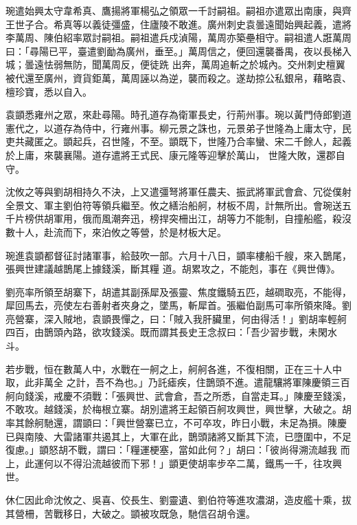 \begin{pinyinscope}
 琬遣始興太守韋希真、鷹揚將軍楊弘之領眾一千討嗣祖。嗣祖亦遣眾出南康，與齊王世子合。希真等以義徒彊盛，住廬陵不敢進。廣州刺史袁曇遠聞始興起義，遣將李萬周、陳伯紹率眾討嗣祖。嗣祖遣兵戍湞陽，萬周亦築壘相守。嗣祖遣人誑萬周曰：「尋陽已平，臺遣劉勔為廣州，垂至。」萬周信之，便回還襲番禺，夜以長梯入城；曇遠怯弱無防，聞萬周反，便徒跣
 出奔，萬周追斬之於城內。交州刺史檀翼被代還至廣州，資貨鉅萬，萬周誣以為逆，襲而殺之。遂劫掠公私銀帛，藉略袁、檀珍寶，悉以自入。



 袁顗悉雍州之眾，來赴尋陽。時孔道存為衛軍長史，行荊州事。琬以黃門侍郎劉道憲代之，以道存為侍中，行雍州事。柳元景之誅也，元景弟子世隆為上庸太守，民吏共藏匿之。顗起兵，召世隆，不至。顗既下，世隆乃合率蠻、宋二千餘人，起義於上庸，來襲襄陽。道存遣將王式民、康元隆等迎擊於萬山，
 世隆大敗，還郡自守。



 沈攸之等與劉胡相持久不決，上又遣彊弩將軍任農夫、振武將軍武會倉、冗從僕射全景文、軍主劉伯符等領兵繼至。攸之繕治船舸，材板不周，計無所出。會琬送五千片榜供胡軍用，俄而風潮奔迅，榜捍突柵出江，胡等力不能制，自撞船艦，殺沒數十人，赴流而下，來泊攸之等營，於是材板大足。



 琬進袁顗都督征討諸軍事，給鼓吹一部。六月十八日，顗率樓船千艘，來入鵲尾，張興世建議越鵲尾上據錢溪，斷其糧
 道。胡累攻之，不能剋，事在《興世傳》。



 劉亮率所領至胡寨下，胡遣其副孫犀及張靈、焦度鐵騎五匹，越磵取亮，不能得，犀回馬去，亮使左右善射者夾身之，墜馬，斬犀首。張繼伯副馬可率所領來降。劉亮營寨，深入賊地，袁顗畏憚之，曰：「賊入我肝臟里，何由得活！」劉胡率輕舸四百，由鵲頭內路，欲攻錢溪。既而謂其長史王念叔曰：「吾少習步戰，未閑水斗。



 若步戰，恒在數萬人中，水戰在一舸之上，舸舸各進，不復相關，正在三十人中取，此非萬全
 之計，吾不為也。」乃託瘧疾，住鵲頭不進。遣龍驤將軍陳慶領三百舸向錢溪，戒慶不須戰：「張興世、武會倉，吾之所悉，自當走耳。」陳慶至錢溪，不敢攻。越錢溪，於梅根立寨。胡別遣將王起領百舸攻興世，興世擊，大破之。胡率其餘舸馳還，謂顗曰：「興世營寨已立，不可卒攻，昨日小戰，未足為損。陳慶已與南陵、大雷諸軍共遏其上，大軍在此，鵲頭諸將又斷其下流，已墮圍中，不足復慮。」顗怒胡不戰，謂曰：「糧運梗塞，當如此何？」胡曰：「彼尚得溯流越我
 而上，此運何以不得沿流越彼而下邪！」顗更使胡率步卒二萬，鐵馬一千，往攻興世。



 休仁因此命沈攸之、吳喜、佼長生、劉靈遺、劉伯符等進攻濃湖，造皮艦十乘，拔其營柵，苦戰移日，大破之。顗被攻既急，馳信召胡令還。




\end{pinyinscope}
